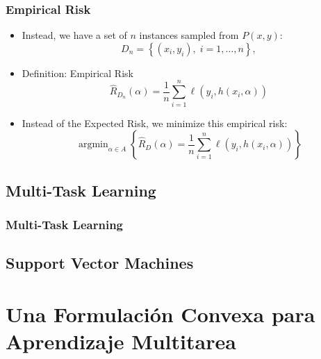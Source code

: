 \documentclass{beamer}
\DeclareMathOperator*{\argmin}{arg\min}
\newcommand{\set}[1]{\left\{#1\right\}}
\newcommand{\hypf}{h}
\newcommand{\hyp}[2]{\hypf\left(#1, #2\right)}
\newcommand{\nsamples}{n}
\newcommand{\param}{\alpha}
\newcommand{\paramspace}{A}
\newcommand{\distf}{P}
\newcommand{\sample}{D}
\newcommand{\samplen}{D_{\nsamples}}
\newcommand{\risk}{R}
\newcommand{\emprisk}{\hat{\risk}_{\sample}}
\newcommand{\empriskn}{\hat{\risk}_{\samplen}}
\begin{document}
\begin{frame}
      \frametitle{Empirical Risk}

      \begin{itemize}
            \item Instead, we have a set of $\nsamples$ instances sampled from $\distf(x,y)$:
            \begin{equation}
                  \nonumber
                  \samplen = \set{(x_i, y_i), \; i=1, \ldots, \nsamples} ,
              \end{equation}
            \item Definition: Empirical Risk
            $$ \empriskn(\param) = \frac{1}{\nsamples} \sum_{i=1}^\nsamples \ell(y_i, \hyp{x_i}{\param}) $$
            \item Instead of the Expected Risk, we minimize this empirical risk:
            \begin{equation}
                  \nonumber
                  \argmin_{\param \in \paramspace} \left\{ \emprisk(\param) = \frac{1}{\nsamples} \sum_{i=1}^\nsamples \ell(y_i, \hyp{x_i}{\param}) \right\}
              \end{equation}
      \end{itemize}

\end{frame}



\subsection{Multi-Task Learning}

\begin{frame}
      \frametitle{Multi-Task Learning}

      

\end{frame}

\subsection{Support Vector Machines}

\section{Una Formulación Convexa para Aprendizaje Multitarea}
\end{document}
